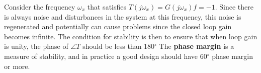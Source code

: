 Consider the frequency $\omega_x$ that satisfies $ T(j\omega_x) = G(j{\omega _x})f =  - 1$. Since there is always noise and disturbances in the system at this frequency, this noise is regenerated and potentially can cause problems since the closed loop gain becomes infinite. The condition for stability is then to ensure that when loop gain is unity, the phase of $\angle T$ should be less than 180$^\circ$  The \textbf{phase margin} is a measure of stability, and in practice a good design should have 60$^\circ$ phase margin or more.
%
%
